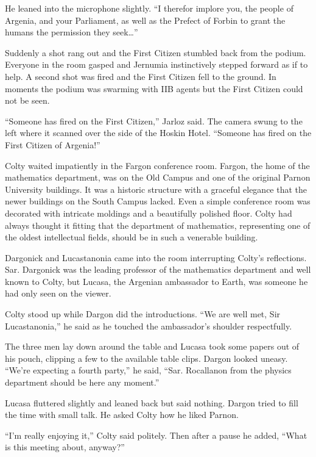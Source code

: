 He leaned into the microphone slightly. ``I therefor implore you, the people of Argenia, and
your Parliament, as well as the Prefect of Forbin to grant the humans the permission they
seek\ldots''

Suddenly a shot rang out and the First Citizen stumbled back from the podium. Everyone in the
room gasped and Jernumia instinctively stepped forward as if to help. A second shot was fired
and the First Citizen fell to the ground. In moments the podium was swarming with IIB agents but
the First Citizen could not be seen.

``Someone has fired on the First Citizen,'' Jarloz said. The camera swung to the left where it
scanned over the side of the Hoskin Hotel. ``Someone has fired on the First Citizen of
Argenia!''

\spacebreak

Colty waited impatiently in the Fargon conference room. Fargon, the home of the mathematics
department, was on the Old Campus and one of the original Parnon University buildings. It was a
historic structure with a graceful elegance that the newer buildings on the South Campus lacked.
Even a simple conference room was decorated with intricate moldings and a beautifully polished
floor. Colty had always thought it fitting that the department of mathematics, representing one
of the oldest intellectual fields, should be in such a venerable building.

Dargonick and Lucastanonia came into the room interrupting Colty's reflections. Sar. Dargonick
was the leading professor of the mathematics department and well known to Colty, but Lucasa, the
Argenian ambassador to Earth, was someone he had only seen on the viewer.

Colty stood up while Dargon did the introductions. ``We are well met, Sir Lucastanonia,'' he
said as he touched the ambassador's shoulder respectfully.

The three men lay down around the table and Lucasa took some papers out of his pouch, clipping a
few to the available table clips. Dargon looked uneasy. ``We're expecting a fourth party,'' he
said, ``Sar. Rocallanon from the physics department should be here any moment.''

Lucasa fluttered slightly and leaned back but said nothing. Dargon tried to fill the time with
small talk. He asked Colty how he liked Parnon.

``I'm really enjoying it,'' Colty said politely. Then after a pause he added, ``What is this
meeting about, anyway?''


